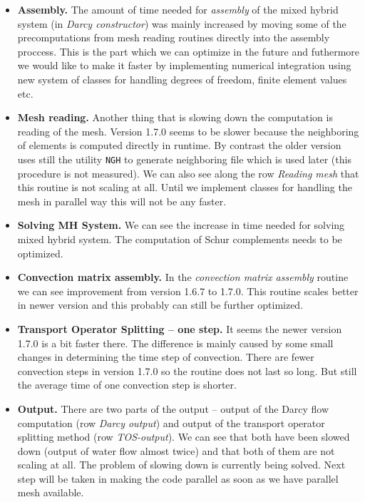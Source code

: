 \begin{itemize}
\item \textbf{Assembly.} The amount of time needed for \emph{assembly} of the mixed hybrid system (in \emph{Darcy constructor}) 
was mainly increased by moving some of the precomputations from mesh reading routines directly into the assembly proccess. 
This is the part which we can optimize in the future and futhermore we would like to make it faster by implementing numerical 
integration using new system of classes for handling degrees of freedom, finite element values etc.

\item \textbf{Mesh reading.} Another thing that is slowing down the computation is reading of the mesh. Version 1.7.0 seems 
to be slower because the neighboring of elements is computed directly in runtime. By contrast the older version uses still 
the utility \verb'NGH' to generate neighboring file which is used later (this procedure is not measured). We can also see along the 
row \emph{Reading mesh} that this routine is not scaling at all. Until we implement classes for handling the mesh in parallel 
way this will not be any faster.

\item \textbf{Solving MH System.} We can see the increase in time needed for solving mixed hybrid system. The computation 
of Schur complements needs to be optimized.

\item \textbf{Convection matrix assembly.}
In the \emph{convection matrix assembly} routine we can see improvement from version 1.6.7 to 1.7.0. This routine scales better in
newer version and this probably can still be further optimized.

\item \textbf{Transport Operator Splitting -- one step.}
It seems the newer version 1.7.0 is a bit faster there. The difference is mainly caused by some small 
changes in determining the time step of convection. There are fewer convection steps in version 
1.7.0 so the routine does not last so long. But still the average time of one convection step 
is shorter.

\item \textbf{Output.} There are two parts of the output -- output of the Darcy flow computation (row \emph{Darcy output}) and 
output of the transport operator splitting method (row \emph{TOS-output}). We can see that both have been slowed down 
(output of water flow almost twice) and that both of them are not scaling at all. The problem of
slowing down is currently being solved. Next step will be taken in making the code parallel as 
soon as we have parallel mesh available.

\end{itemize}

